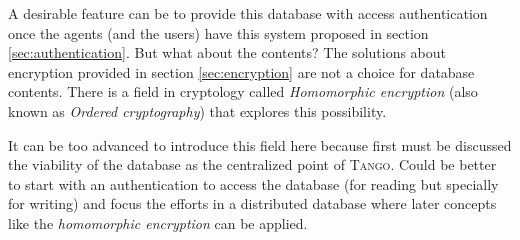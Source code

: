 \documentclass[10pt,a4paper,twoside]{llncs}
\newcommand{\tango}{\textsc{Tango}}
\begin{document}
A desirable feature can be to provide this database with access authentication once the agents (and the users) have this system proposed in section \ref{sec:authentication}. But what about the contents? The solutions about encryption provided in section \ref{sec:encryption} are not a choice for database contents. There is a field in cryptology called \emph{Homomorphic encryption} (also known as \emph{Ordered cryptography}) that explores this possibility.

It can be too advanced to introduce this field here because first must be discussed the viability of the database as the centralized point of \tango. Could be better to start with an authentication to access the database (for reading but specially for writing) and focus the efforts in a distributed database where later concepts like the \emph{homomorphic encryption} can be applied.

% 
\end{document}
